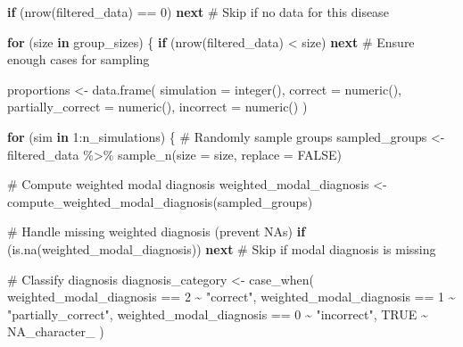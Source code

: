 \documentclass[
  letterpaper,
  DIV=11,
  numbers=noendperiod]{scrartcl}
\newenvironment{Shaded}{\begin{snugshade}}{\end{snugshade}}
\newcommand{\AttributeTok}[1]{\textcolor[rgb]{0.40,0.45,0.13}{#1}}
\newcommand{\CommentTok}[1]{\textcolor[rgb]{0.37,0.37,0.37}{#1}}
\newcommand{\ConstantTok}[1]{\textcolor[rgb]{0.56,0.35,0.01}{#1}}
\newcommand{\ControlFlowTok}[1]{\textcolor[rgb]{0.00,0.23,0.31}{\textbf{#1}}}
\newcommand{\DecValTok}[1]{\textcolor[rgb]{0.68,0.00,0.00}{#1}}
\newcommand{\FunctionTok}[1]{\textcolor[rgb]{0.28,0.35,0.67}{#1}}
\newcommand{\NormalTok}[1]{\textcolor[rgb]{0.00,0.23,0.31}{#1}}
\newcommand{\OtherTok}[1]{\textcolor[rgb]{0.00,0.23,0.31}{#1}}
\newcommand{\SpecialCharTok}[1]{\textcolor[rgb]{0.37,0.37,0.37}{#1}}
\newcommand{\StringTok}[1]{\textcolor[rgb]{0.13,0.47,0.30}{#1}}
\begin{document}
\begin{Shaded}
\begin{Highlighting}[]
  \ControlFlowTok{if}\NormalTok{ (}\FunctionTok{nrow}\NormalTok{(filtered\_data) }\SpecialCharTok{==} \DecValTok{0}\NormalTok{) }\ControlFlowTok{next}  \CommentTok{\# Skip if no data for this disease}
  
  \ControlFlowTok{for}\NormalTok{ (size }\ControlFlowTok{in}\NormalTok{ group\_sizes) \{}
    \ControlFlowTok{if}\NormalTok{ (}\FunctionTok{nrow}\NormalTok{(filtered\_data) }\SpecialCharTok{\textless{}}\NormalTok{ size) }\ControlFlowTok{next}  \CommentTok{\# Ensure enough cases for sampling}

\NormalTok{    proportions }\OtherTok{\textless{}{-}} \FunctionTok{data.frame}\NormalTok{(}
      \AttributeTok{simulation =} \FunctionTok{integer}\NormalTok{(),}
      \AttributeTok{correct =} \FunctionTok{numeric}\NormalTok{(),}
      \AttributeTok{partially\_correct =} \FunctionTok{numeric}\NormalTok{(),}
      \AttributeTok{incorrect =} \FunctionTok{numeric}\NormalTok{()}
\NormalTok{    )}
    
    \ControlFlowTok{for}\NormalTok{ (sim }\ControlFlowTok{in} \DecValTok{1}\SpecialCharTok{:}\NormalTok{n\_simulations) \{}
      \CommentTok{\# Randomly sample groups}
\NormalTok{      sampled\_groups }\OtherTok{\textless{}{-}}\NormalTok{ filtered\_data }\SpecialCharTok{\%\textgreater{}\%}
        \FunctionTok{sample\_n}\NormalTok{(}\AttributeTok{size =}\NormalTok{ size, }\AttributeTok{replace =} \ConstantTok{FALSE}\NormalTok{)}

      \CommentTok{\# Compute weighted modal diagnosis}
\NormalTok{      weighted\_modal\_diagnosis }\OtherTok{\textless{}{-}} \FunctionTok{compute\_weighted\_modal\_diagnosis}\NormalTok{(sampled\_groups)}

      \CommentTok{\# Handle missing weighted diagnosis (prevent NAs)}
      \ControlFlowTok{if}\NormalTok{ (}\FunctionTok{is.na}\NormalTok{(weighted\_modal\_diagnosis)) }\ControlFlowTok{next}  \CommentTok{\# Skip if modal diagnosis is missing}

      \CommentTok{\# Classify diagnosis}
\NormalTok{      diagnosis\_category }\OtherTok{\textless{}{-}} \FunctionTok{case\_when}\NormalTok{(}
\NormalTok{        weighted\_modal\_diagnosis }\SpecialCharTok{==} \DecValTok{2} \SpecialCharTok{\textasciitilde{}} \StringTok{"correct"}\NormalTok{,}
\NormalTok{        weighted\_modal\_diagnosis }\SpecialCharTok{==} \DecValTok{1} \SpecialCharTok{\textasciitilde{}} \StringTok{"partially\_correct"}\NormalTok{,}
\NormalTok{        weighted\_modal\_diagnosis }\SpecialCharTok{==} \DecValTok{0} \SpecialCharTok{\textasciitilde{}} \StringTok{"incorrect"}\NormalTok{,}
        \ConstantTok{TRUE} \SpecialCharTok{\textasciitilde{}} \ConstantTok{NA\_character\_}
\NormalTok{      )}


\end{Highlighting}
\end{Shaded}
\end{document}
